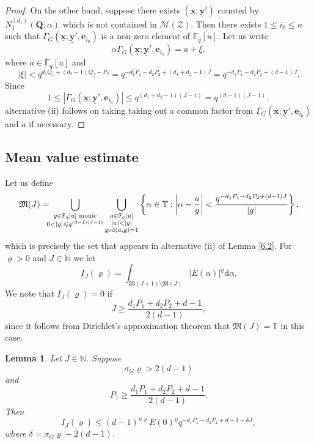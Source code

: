 \documentclass[12pt, reqno]{amsart}
\numberwithin{equation}{section}
\renewcommand{\d}{\mathrm{d}}
\newcommand{\0}{\mathbf{0}}
\newcommand{\FF}{\mathbb{F}}
\newcommand{\NN}{\mathbb{N}}
\newcommand{\TT}{\mathbb{T}}
\renewcommand{\leq}{\leqslant}
\renewcommand{\geq}{\geqslant}
\renewcommand{\=}{\equiv}
\newcommand{\1}{\mathbf{1}}
\newtheorem{lemma}[theorem]{Lemma}
\theoremstyle{definition}
\begin{document}
\begin{proof}
On the other hand, suppose there exists $(\underline{\mathbf{x}}, \underline{\mathbf{y}}')$ counted by
$N_1^{(d_1)}(\mathbf Q; \alpha)$ which is not contained in $\mathcal{M}(\mathcal{Z})$.
Then there exists $1 \leq i_0 \leq n$ such that
$
 \Gamma_G(\underline{\mathbf{x}};  \underline{\mathbf{y}}', \mathbf{e}_{i_0})$ is a non-zero element of $\FF_q[u]$.
Let us write
$$
\alpha \Gamma_G(\underline{\mathbf{x}};  \underline{\mathbf{y}}', \mathbf{e}_{i_0}) = a + \xi,
$$
where $a \in \FF_q[u]$ and
$$
|\xi | <  q^{  d_1 Q_1 + (d_2 - 1) Q_2 - P_2 } = q^{ - d_1 P_1 - d_2 P_2 + (d_1 + d_2 - 1) J }  = q^{ - d_1 P_1 - d_2 P_2 + (d - 1) J }.
$$
Since
$$
1 \leq |\Gamma_G(\underline{\mathbf{x}};  \underline{\mathbf{y}}', \mathbf{e}_{i_0})| \leq q^{ (d_1 + d_2 - 1) (J-1) }  = q^{ (d - 1) (J - 1) },
$$
alternative (ii) follows on taking  taking out a common factor from $\Gamma_G(\underline{\mathbf{x}};  \underline{\mathbf{y}}', \mathbf{e}_{i_0})$ and $a$ if necessary. \end{proof}



\subsection{Mean value estimate}
Let us define
$$
\mathfrak{M}(J)=
\hspace{-0.2cm}
\bigcup_{\substack{g\in \FF_q[u] \text{ monic}\\
0<|g|\leq q^{(d-1)(J-1)}
}}
\bigcup_{\substack{a \in \FF_q[u]\\
|a|<|g|\\ \gcd(a,g)=1}} \left\{\alpha \in \TT: \left|\alpha - \frac{ a}{g}\right|<\frac{q^{-d_1
P_1 - d_2 P_2 + (d-1) J }}{|g|}\right\},
$$
which  is precisely the set that appears in alternative (ii) of Lemma \ref{6.2}.
For $\varrho > 0$ and $J \in \NN$ we let
$$
I_J (\varrho) =
  \int_{ \mathfrak{M}(J+1) \setminus  \mathfrak{M}(J)} |E(\alpha)|^\varrho   \d \alpha.
$$
We note that $I_J(\varrho) = 0$ if
\begin{equation}
\label{Diri}
J \geq \frac{ d_1 P_1 + d_2 P_2  + d - 1 }{ 2( d -  1)},
\end{equation}
since it follows from Dirichlet's approximation theorem 
\cite[Lemma 3]{kubota}  that $\mathfrak{M}(J) = \TT$
in this case.
\begin{lemma}\label{lem:IJ-large}
Let $J \in \NN$.
Suppose
$$
\sigma_G  \varrho > 2 (d-1)
$$
and
$$
P_1 \geq \frac{ d_1 P_1 + d_2 P_2  + d - 1 }{ 2( d -  1)}.
$$
Then
$$
I_J  (\varrho) \leq (d-1)^{ n \varrho} E(0)^{\varrho} q^{  - d_1 P_1 - d_2 P_2 + d-1 - \delta J},
$$
where $\delta = \sigma_G \varrho - 2 (d-1)$.
\end{lemma}
\end{document}

